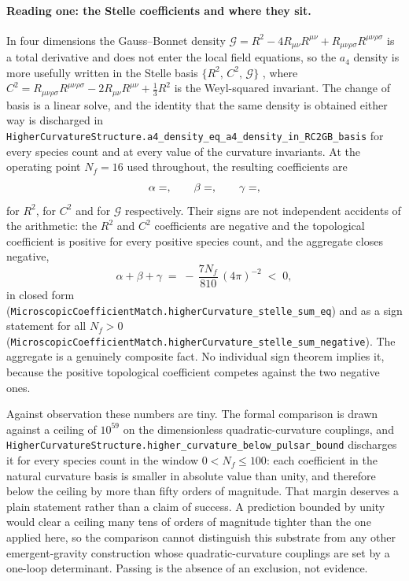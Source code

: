 \documentclass[aps,prd,nofootinbib,superscriptaddress,12pt]{revtex4-2}
\DeclareRobustCommand{\lb}{\discretionary{}{}{}}
\begin{document}
\paragraph{Reading one: the Stelle coefficients and where they sit.}
In four dimensions the Gauss--Bonnet density
$\mathcal G = R^2 - 4R_{\mu\nu}R^{\mu\nu} +
R_{\mu\nu\rho\sigma}R^{\mu\nu\rho\sigma}$
is a total derivative and does not enter the local field equations, so the
$a_4$ density is more usefully written in the Stelle basis
$\{R^2,\,C^2,\,\mathcal G\}$ \cite{Stelle1977}, where
$C^2 = R_{\mu\nu\rho\sigma}R^{\mu\nu\rho\sigma} - 2R_{\mu\nu}R^{\mu\nu} +
\tfrac13 R^2$
is the Weyl-squared invariant. The change of basis is a linear solve, and the
identity that the same density is obtained either way is discharged in
\texttt{Higher\lb{}Curvature\lb{}Structure.\lb{}a4\_\lb{}density\_\lb{}eq\_\lb{}a4\_\lb{}density\_\lb{}in\_\lb{}RC2GB\_\lb{}basis}
for every species count and at every value of the curvature invariants. At the
operating point $N_f = 16$ used throughout, the resulting coefficients are
\begin{equation}
\label{eq:stelle-triple}
\alpha = \unskip,\qquad
\beta  = \unskip,\qquad
\gamma = \unskip,
\end{equation}
for $R^2$, for $C^2$ and for $\mathcal G$ respectively. Their signs are not
independent accidents of the arithmetic: the $R^2$ and $C^2$ coefficients are
negative and the topological coefficient is positive for every positive species
count, and the aggregate closes negative,
\begin{equation}
\label{eq:stelle-aggregate}
\alpha + \beta + \gamma \;=\; -\,\frac{7 N_f}{810}\,(4\pi)^{-2} \;<\; 0 ,
\end{equation}
in closed form
(\texttt{Microscopic\lb{}Coefficient\lb{}Match.\lb{}higher\lb{}Curvature\_\lb{}stelle\_\lb{}sum\_\lb{}eq}) and as a
sign statement for all $N_f > 0$
(\texttt{Microscopic\lb{}Coefficient\lb{}Match.\lb{}higher\lb{}Curvature\_\lb{}stelle\_\lb{}sum\_\lb{}negative}).
The aggregate is a genuinely composite fact. No individual sign theorem implies
it, because the positive topological coefficient competes against the two
negative ones.

Against observation these numbers are tiny. The formal comparison is drawn
against a ceiling of $10^{59}$ on the dimensionless quadratic-curvature
couplings, and
\texttt{Higher\lb{}Curvature\lb{}Structure.\lb{}higher\_\lb{}curvature\_\lb{}below\_\lb{}pulsar\_\lb{}bound}
discharges it for every species count in the window $0 < N_f \le 100$: each
coefficient in the natural curvature basis is smaller in absolute value than
unity, and therefore below the ceiling by more than fifty orders of magnitude.
That margin deserves a plain statement rather than a claim of success. A
prediction bounded by unity would clear a ceiling many tens of orders of
magnitude tighter than the one applied here, so the comparison cannot
distinguish this substrate from any other emergent-gravity construction whose
quadratic-curvature couplings are set by a one-loop determinant. Passing is the
absence of an exclusion, not evidence.
\end{document}
